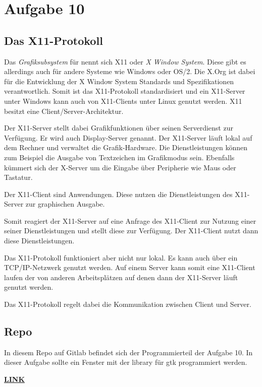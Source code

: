 \chapter{Aufgabe 10}
\section{Das X11-Protokoll}
Das \textit{Grafiksubsystem} für  nennt sich X11 oder \textit{X Window System}.
Diese gibt es allerdings auch für andere Systeme wie Windows oder OS/2.
Die X.Org ist dabei für die Entwicklung der X Window System Standards und Spezifikationen verantwortlich.
Somit ist das X11-Protokoll standardisiert und ein X11-Server unter Windows kann auch von X11-Clients unter Linux genutzt werden.
X11 besitzt eine Client/Server-Architektur.\par
Der X11-Server stellt dabei Grafikfunktionen über seinen Serverdienst zur Verfügung.
Er wird auch Display-Server genannt.
Der X11-Server läuft lokal auf dem Rechner und verwaltet die Grafik-Hardware.
Die Dienstleistungen können zum Beispiel die Ausgabe von Textzeichen im Grafikmodus sein.
Ebenfalls kümmert sich der X-Server um die Eingabe über Peripherie wie Maus oder Tastatur.\par
Der X11-Client sind Anwendungen.
Diese nutzen die Dienstleistungen des X11-Server zur graphischen Ausgabe. \par
Somit reagiert der X11-Server auf eine Anfrage des X11-Client zur Nutzung einer seiner Dienstleistungen und stellt diese zur Verfügung.
Der X11-Client nutzt dann diese Dienstleistungen. \par
Das X11-Protokoll funktioniert aber nicht nur lokal.
Es kann auch über ein TCP/IP-Netzwerk genutzt werden.
Auf einem Server kann somit eine X11-Client laufen der von anderen Arbeitsplätzen auf denen dann der X11-Server läuft genutzt werden.\par
Das X11-Protokoll regelt dabei die Kommunikation zwischen Client und Server\cite{xwindow:2023}\cite{x11:2012}.

\section{Repo}
In diesem Repo auf Gitlab befindet sich der Programmierteil der Aufgabe 10. In dieser Aufgabe sollte ein Fenster mit der library für gtk programmiert werden.\par
\href{https://gitlab.thga.de/daniel.krueger/pruefung_sose_2023_aufgabe_10_gui}{\textbf{LINK}}
